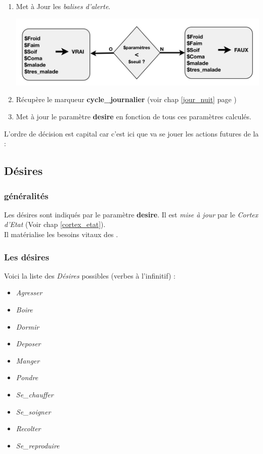 \documentclass[french]{report}
\newlength{\du}\fi
\begin{document}
\begin{enumerate}
	\item Met à Jour les \textit{balises d'alerte}.
	\begin{center}
		\includegraphics[width=1\linewidth]{images/cortex05}
	\end{center}

	\item Récupère le marqueur \textbf{cycle\_journalier} (voir chap \ref{jour_nuit} page \pageref{jour_nuit})\\
	
	\item Met à jour le paramètre \textbf{desire} en fonction de tous ces paramètres calculés.\\

\end{enumerate}
L'ordre de décision est capital car c'est ici que va se jouer les actions futures de la \CoCiX : \\

\subsection{Désires}\label{desire}
\subsubsection{généralités}
Les désires sont indiqués par le paramètre \textbf{desire}. Il est \textit{mise à jour} par le \textit{Cortex d'Etat} (Voir chap \ref{cortex_etat}).\\
Il matérialise les besoins vitaux des \CoCiX.\\

\subsubsection{Les désires}
Voici la liste des \textit{Désires} possibles (verbes à l'infinitif) : \\
\begin{itemize}
	\item \textit{Agresser}
	\item \textit{Boire}
	\item \textit{Dormir}
	\item \textit{Deposer}
	\item \textit{Manger}
	\item \textit{Pondre}
	\item \textit{Se\_chauffer}
	\item \textit{Se\_soigner}
	\item \textit{Recolter}
	\item \textit{Se\_reproduire}\\
\end{itemize}
\end{document}

